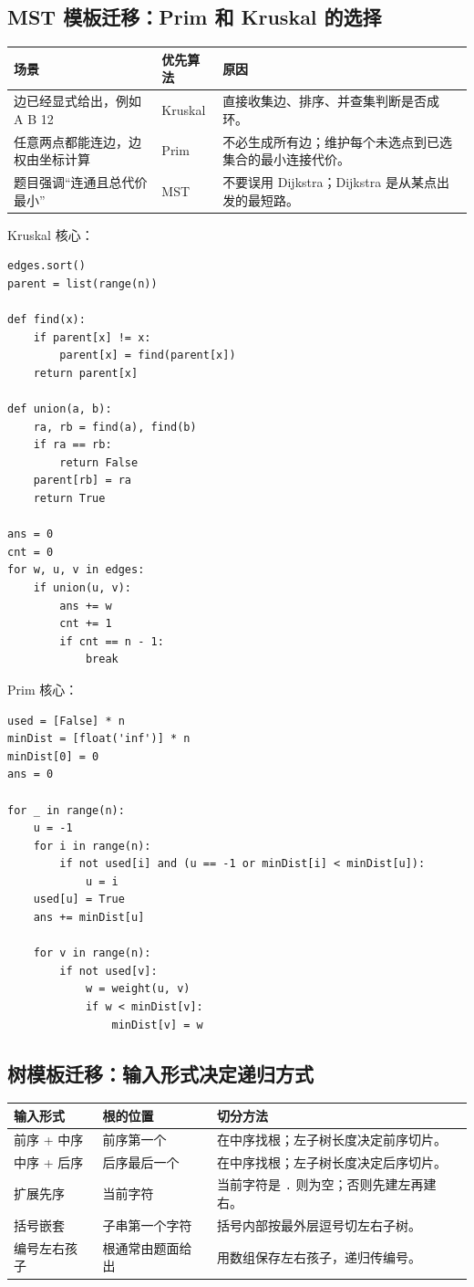 \documentclass[10pt,a4paper,fontset=none]{ctexart}
\begin{document}
\subsection{MST 模板迁移：Prim 和 Kruskal 的选择}
\begin{longtable}{L{3cm}L{4cm}L{6.5cm}}
\toprule
\textbf{场景} & \textbf{优先算法} & \textbf{原因} \\
\midrule
边已经显式给出，例如 A B 12 & Kruskal & 直接收集边、排序、并查集判断是否成环。\\
任意两点都能连边，边权由坐标计算 & Prim & 不必生成所有边；维护每个未选点到已选集合的最小连接代价。\\
题目强调“连通且总代价最小” & MST & 不要误用 Dijkstra；Dijkstra 是从某点出发的最短路。\\
\bottomrule
\end{longtable}

Kruskal 核心：
\begin{lstlisting}[style=py]
edges.sort()
parent = list(range(n))

def find(x):
    if parent[x] != x:
        parent[x] = find(parent[x])
    return parent[x]

def union(a, b):
    ra, rb = find(a), find(b)
    if ra == rb:
        return False
    parent[rb] = ra
    return True

ans = 0
cnt = 0
for w, u, v in edges:
    if union(u, v):
        ans += w
        cnt += 1
        if cnt == n - 1:
            break
\end{lstlisting}

Prim 核心：
\begin{lstlisting}[style=py]
used = [False] * n
minDist = [float('inf')] * n
minDist[0] = 0
ans = 0

for _ in range(n):
    u = -1
    for i in range(n):
        if not used[i] and (u == -1 or minDist[i] < minDist[u]):
            u = i
    used[u] = True
    ans += minDist[u]

    for v in range(n):
        if not used[v]:
            w = weight(u, v)
            if w < minDist[v]:
                minDist[v] = w
\end{lstlisting}

\subsection{树模板迁移：输入形式决定递归方式}

\begin{longtable}{L{3.5cm}L{4.2cm}L{6cm}}
\toprule
\textbf{输入形式} & \textbf{根的位置} & \textbf{切分方法} \\
\midrule
前序 + 中序 & 前序第一个 & 在中序找根；左子树长度决定前序切片。\\
中序 + 后序 & 后序最后一个 & 在中序找根；左子树长度决定后序切片。\\
扩展先序 & 当前字符 & 当前字符是 \texttt{.} 则为空；否则先建左再建右。\\
括号嵌套 & 子串第一个字符 & 括号内部按最外层逗号切左右子树。\\
编号左右孩子 & 根通常由题面给出 & 用数组保存左右孩子，递归传编号。\\
\bottomrule
\end{longtable}
\end{document}

